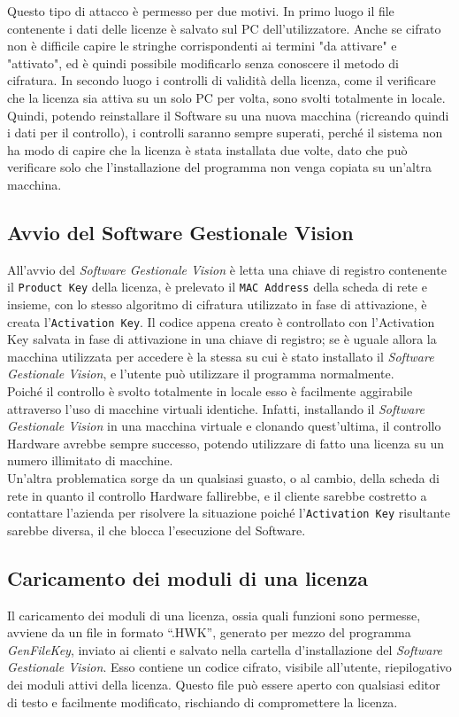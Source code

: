 Questo tipo di attacco è permesso per due motivi. In primo luogo il file contenente i dati delle licenze è salvato sul PC dell'utilizzatore. Anche se cifrato non è difficile capire le stringhe corrispondenti ai termini "da attivare" e "attivato", ed è quindi possibile modificarlo senza conoscere il metodo di cifratura. In secondo luogo i controlli di validità della licenza, come il verificare che la licenza sia attiva su un solo PC per volta, sono svolti totalmente in locale. Quindi, potendo reinstallare il Software su una nuova macchina (ricreando quindi i dati per il controllo), i controlli saranno sempre superati, perché il sistema non ha modo di capire che la licenza è stata installata due volte, dato che può verificare solo che l'installazione del programma non venga copiata su un'altra macchina. 

\subsection{Avvio del Software Gestionale Vision} 

All'avvio del \textit{Software Gestionale Vision} è letta una chiave di registro contenente il \texttt{Product Key} della licenza, è prelevato il \texttt{MAC Address} della scheda di rete e insieme, con lo stesso algoritmo di cifratura utilizzato in fase di attivazione, è creata l'\texttt{Activation Key}. Il codice appena creato è controllato con l’Activation Key salvata in fase di attivazione in una chiave di registro; se è uguale allora la macchina utilizzata per accedere è la stessa su cui è stato installato il \textit{Software Gestionale Vision}, e l’utente può utilizzare il programma normalmente.\\
Poiché il controllo è svolto totalmente in locale esso è facilmente aggirabile attraverso l’uso di macchine virtuali identiche. Infatti, installando il \textit{Software Gestionale Vision} in una macchina virtuale e clonando quest'ultima, il controllo Hardware avrebbe sempre successo, potendo utilizzare di fatto una licenza su un numero illimitato di macchine. 
\\Un'altra problematica sorge da un qualsiasi guasto, o al cambio, della scheda di rete in quanto il controllo Hardware fallirebbe, e il cliente sarebbe costretto a contattare l’azienda per risolvere la situazione poiché l'\texttt{Activation Key} risultante sarebbe diversa, il che blocca l'esecuzione del Software.

\subsection{Caricamento dei moduli di una licenza} 
Il caricamento dei moduli di una licenza, ossia quali funzioni sono permesse, avviene da un file in formato “.HWK”, generato per mezzo del 
programma \textit{GenFileKey}, inviato ai clienti e salvato nella cartella d'installazione del \textit{Software Gestionale Vision}. Esso contiene un codice cifrato, visibile all’utente, riepilogativo dei moduli attivi della licenza. Questo file può essere aperto con qualsiasi editor di testo e facilmente modificato, rischiando di compromettere la licenza.


